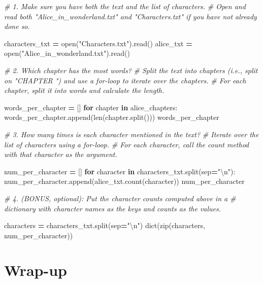 \documentclass[
]{book}
\newenvironment{Shaded}{\begin{snugshade}}{\end{snugshade}}
\newcommand{\BuiltInTok}[1]{#1}
\newcommand{\CharTok}[1]{\textcolor[rgb]{0.31,0.60,0.02}{#1}}
\newcommand{\CommentTok}[1]{\textcolor[rgb]{0.56,0.35,0.01}{\textit{#1}}}
\newcommand{\ControlFlowTok}[1]{\textcolor[rgb]{0.13,0.29,0.53}{\textbf{#1}}}
\newcommand{\KeywordTok}[1]{\textcolor[rgb]{0.13,0.29,0.53}{\textbf{#1}}}
\newcommand{\NormalTok}[1]{#1}
\newcommand{\OperatorTok}[1]{\textcolor[rgb]{0.81,0.36,0.00}{\textbf{#1}}}
\newcommand{\StringTok}[1]{\textcolor[rgb]{0.31,0.60,0.02}{#1}}
\begin{document}
\begin{Shaded}
\begin{Highlighting}[]
\CommentTok{# 1. Make sure you have both the text and the list of characters.}
\CommentTok{# Open and read both "Alice_in_wonderland.txt" and "Characters.txt" if you have not already done so.}

\NormalTok{characters_txt }\OperatorTok{=} \BuiltInTok{open}\NormalTok{(}\StringTok{"Characters.txt"}\NormalTok{).read()}
\NormalTok{alice_txt }\OperatorTok{=} \BuiltInTok{open}\NormalTok{(}\StringTok{"Alice_in_wonderland.txt"}\NormalTok{).read()}

\CommentTok{# 2. Which chapter has the most words?}
\CommentTok{# Split the text into chapters (i.e., split on "CHAPTER ") and use a for-loop to iterate over the chapters.}
\CommentTok{# For each chapter, split it into words and calculate the length.}

\NormalTok{words_per_chapter }\OperatorTok{=}\NormalTok{ []}
\ControlFlowTok{for}\NormalTok{ chapter }\KeywordTok{in}\NormalTok{ alice_chapters:}
\NormalTok{    words_per_chapter.append(}\BuiltInTok{len}\NormalTok{(chapter.split()))}
\NormalTok{words_per_chapter}

\CommentTok{# 3. How many times is each character mentioned in the text?}
\CommentTok{# Iterate over the list of characters using a for-loop. }
\CommentTok{# For each character, call the count method with that character as the argument.}

\NormalTok{num_per_character }\OperatorTok{=}\NormalTok{ []}
\ControlFlowTok{for}\NormalTok{ character }\KeywordTok{in}\NormalTok{ characters_txt.split(sep}\OperatorTok{=}\StringTok{"}\CharTok{\textbackslash{}n}\StringTok{"}\NormalTok{):}
\NormalTok{    num_per_character.append(alice_txt.count(character))}
\NormalTok{num_per_character}

\CommentTok{# 4. (BONUS, optional): Put the character counts computed above in a }
\CommentTok{# dictionary with character names as the keys and counts as the values.}

\NormalTok{characters }\OperatorTok{=}\NormalTok{ characters_txt.split(sep}\OperatorTok{=}\StringTok{"}\CharTok{\textbackslash{}n}\StringTok{"}\NormalTok{)}
\BuiltInTok{dict}\NormalTok{(}\BuiltInTok{zip}\NormalTok{(characters, num_per_character))}
\end{Highlighting}
\end{Shaded}

\hypertarget{wrap-up-5}{%
\section{Wrap-up}\label{wrap-up-5}}
\end{document}
